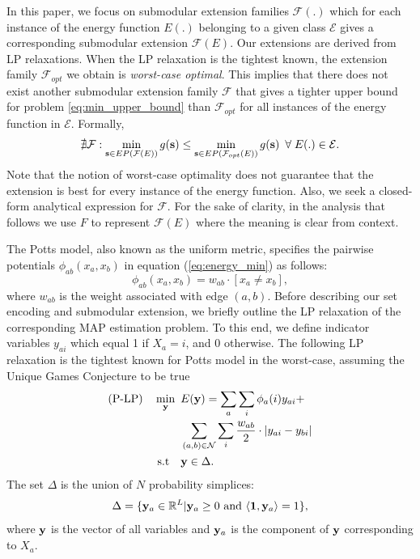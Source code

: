 
In this paper, we focus on submodular extension families $\mathcal F(.)$ which
for each instance of the energy function $E(.)$ belonging to a given class $\mathcal E$ gives a corresponding
submodular extension ${\mathcal F}(E)$. Our extensions are derived from LP relaxations. When the LP relaxation is the tightest known, the extension family ${\mathcal
F}_{opt}$ we obtain is \emph{worst-case optimal}. This implies that there does not
exist another submodular extension family ${\mathcal F}$ that gives a tighter
upper bound for problem \eqref{eq:min_upper_bound} than ${\mathcal F}_{opt}$
for all instances of the energy function in $\mathcal E$. Formally, 
\begin{equation}
    \nexists {\mathcal F}: \min_{{\bf s} \in EP({\mathcal F}(E))} g({\bf s})
    \leq \min_{{\bf s} \in EP({\mathcal F}_{opt}(E))} g({\bf s}) \enspace
    \forall \; E(.) \in \mathcal E.
    \label{eq:best_submod}
\end{equation}
Note that the notion of worst-case optimality does not guarantee that the extension is best for every instance of the energy function. 
Also, we seek a closed-form analytical expression for $\mathcal F$. For the sake of clarity,
in the analysis that follows we use $F$ to represent ${\mathcal F}(E)$ where
the meaning is clear from context.

The Potts model, also known as the uniform metric, specifies the pairwise potentials $\phi_{ab}(x_a, x_b)$ in equation (\ref{eq:energy_min}) as follows:
\begin{equation}
    \phi_{ab}(x_a, x_b) = w_{ab} \cdot [x_a \neq x_b],
\end{equation}
where $w_{ab}$ is the weight associated with edge $(a, b)$. 
%
 Before describing our set encoding and submodular extension, we briefly outline the LP relaxation of the corresponding MAP estimation problem. To this end, we define indicator variables $y_{ai}$ which equal 1 if $X_a = i$, and 0 otherwise. The following LP relaxation is the tightest known for Potts model in the worst-case, assuming the Unique Games Conjecture to be true \citep{manokaran2008sdp}
\begin{align}
    \text{(P-LP)} \quad \min_{\bf y} \enskip & E({\bf y}) =  \sum_{a} \sum_{i} \phi_a(i)y_{ai} + \nonumber\\
     &\sum_{(a, b) \in {\mathcal N}} \sum_{i} \frac{w_{ab}}{2} \cdot |y_{ai} - y_{bi}| \nonumber\\
    \text{s.t} \quad &{\bf y} \in \Delta.
\label{eq:p-lp}
\end{align}
The set $\Delta$ is the union of $N$ probability simplices:
\begin{equation}
    \Delta = \{{\bf y}_a \in \mathbb{R}^L | {\bf y}_a \geq 0  \textrm{ and } \langle {\bf 1}, {\bf y}_a \rangle = 1\},
    \label{eq:delta}
\end{equation}
where $\bf y$ is the vector of all variables and ${\bf y}_a$ is the component
of $\bf y$ corresponding to $X_a$.


